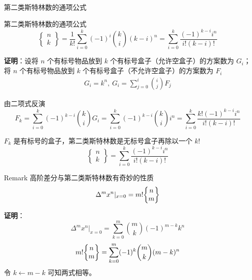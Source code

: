 \documentclass[UTF8]{beamer}
\begin{document}
    \begin{frame}{第二类斯特林数的通项公式}
        
        \vspace{-0.2em}
        \begin{block}{第二类斯特林数的通项公式}
            \vspace{-1em}
            $$
            \begin{Bmatrix}n\\k\end{Bmatrix}=\dfrac{1}{k!}\sum\limits_{i=0}^k(-1)^i\binom{k}{i}(k-i)^n = \sum_{i=0}^k\frac{(-1)^{k-i}i^n}{i!(k-i)!}
            $$
            \vspace{-1em}
        \end{block}
        \pause
        \textbf{证明}：设将 $n$ 个有标号物品放到 $k$ 个有标号盒子（允许空盒子）的方案数为 $G_i$；将 $n$ 个有标号物品放到 $k$ 个有标号盒子（不允许空盒子）的方案数为 $F_i$
        \vspace{-0.2em}
        \begin{gather*}
        G_i = k^n,\ G_i = \sum_{j=0}^i \binom{i}{j}F_j
        \end{gather*}

        \vspace{-0.5em}
        \pause
        由二项式反演
        \vspace{-1em}
        $$
        F_k=\sum_{i=0}^k(-1)^{k-i}\binom{k}{i}G_i=\sum_{i=0}^k(-1)^{k-i}\binom{k}{i}i^n=\sum_{i=0}^k\frac{k!(-1)^{k-i}i^n}{i!(k-i)!}
        $$
        
        $F_k$ 是有标号的盒子，第二类斯特林数是无标号盒子再除以一个 $k!$
        \vspace{-0.2em}
        $$
        \begin{Bmatrix}n\\k\end{Bmatrix} = \sum_{i=0}^k\frac{(-1)^{k-i}i^n}{i!(k-i)!}
        $$
    \end{frame}

    
    \begin{frame}
        \begin{block}{Remark}
            高阶差分与第二类斯特林数有奇妙的性质
            $$
            \Delta^m x^n|_{x=0}=m!\St nm
            $$
        \end{block}
        \pause
        \textbf{证明}：
        $$
        \Delta ^m x^n|_{x=0}=\sum_{k=0}^m\binom{m}{k}(-1)^{m-k}k^n
        $$
        $$
        m!\St{n}{m}=\sum_{k=0}^m(-1)^k\binom{m}{k}(m-k)^n
        $$
        令 $k\gets m-k$ 可知两式相等。
    \end{frame}
\end{document}
